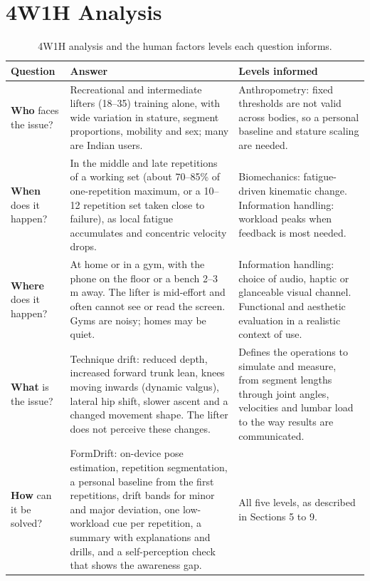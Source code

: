 \documentclass[12pt]{article}
\begin{document}
\section{4W1H Analysis}

\begin{table}[!htbp]
\centering
\caption{4W1H analysis and the human factors levels each question informs.}
\small
\begin{tabularx}{\textwidth}{>{\raggedright\arraybackslash}p{2.0cm} L >{\raggedright\arraybackslash}p{4.2cm}}
\toprule
\textbf{Question} & \textbf{Answer} & \textbf{Levels informed} \\
\midrule
\textbf{Who} faces the issue? & Recreational and intermediate lifters (18--35) training alone, with wide variation in stature, segment proportions, mobility and sex; many are Indian users. & Anthropometry: fixed thresholds are not valid across bodies, so a personal baseline and stature scaling are needed. \\
\textbf{When} does it happen? & In the middle and late repetitions of a working set (about 70--85\% of one-repetition maximum, or a 10--12 repetition set taken close to failure), as local fatigue accumulates and concentric velocity drops. & Biomechanics: fatigue-driven kinematic change. Information handling: workload peaks when feedback is most needed. \\
\textbf{Where} does it happen? & At home or in a gym, with the phone on the floor or a bench 2--3 m away. The lifter is mid-effort and often cannot see or read the screen. Gyms are noisy; homes may be quiet. & Information handling: choice of audio, haptic or glanceable visual channel. Functional and aesthetic evaluation in a realistic context of use. \\
\textbf{What} is the issue? & Technique drift: reduced depth, increased forward trunk lean, knees moving inwards (dynamic valgus), lateral hip shift, slower ascent and a changed movement shape. The lifter does not perceive these changes. & Defines the operations to simulate and measure, from segment lengths through joint angles, velocities and lumbar load to the way results are communicated. \\
\textbf{How} can it be solved? & FormDrift: on-device pose estimation, repetition segmentation, a personal baseline from the first repetitions, drift bands for minor and major deviation, one low-workload cue per repetition, a summary with explanations and drills, and a self-perception check that shows the awareness gap. & All five levels, as described in Sections 5 to 9. \\
\bottomrule
\end{tabularx}
\end{table}
\end{document}

